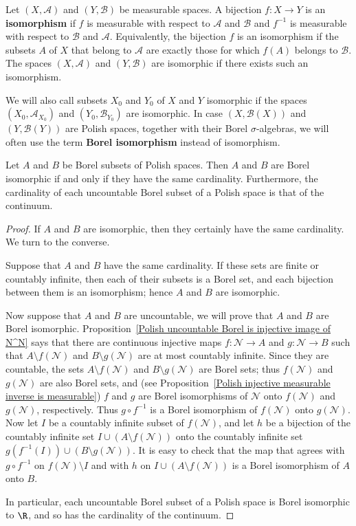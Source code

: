 Let $(X,\mathcal{A})$ and $(Y,\mathcal{B})$ be measurable spaces. A bijection $f:X\to Y$ is an \textbf{isomorphism} if $f$ is measurable with respect to $\mathcal{A}$ and $\mathcal{B}$ and $f^{-1}$ is measurable with respect to $\mathcal{B}$ and $\mathcal{A}$. Equivalently, the bijection $f$ is an isomorphism if the subsets $A$ of $X$ that belong to $\mathcal{A}$ are exactly those for which $f(A)$ belongs to $\mathcal{B}$. The spaces $(X,\mathcal{A})$ and $(Y,\mathcal{B})$ are isomorphic if there exists such an isomorphism.\par
We will also call subsets $X_0$ and $Y_0$ of $X$ and $Y$ isomorphic if the spaces $(X_0,\mathcal{A}_{X_0})$ and $(Y_0,\mathcal{B}_{Y_0})$ are isomorphic. In case $(X,\mathcal{B}(X))$ and $(Y,\mathcal{B}(Y))$ are Polish spaces, together with their Borel $\sigma$-algebras, we will often use the term \textbf{Borel isomorphism} instead of isomorphism.
\begin{theorem}\label{Polish Borel iso iff cardinality}
Let $A$ and $B$ be Borel subsets of Polish spaces. Then $A$ and $B$ are Borel isomorphic if and only if they have the same cardinality. Furthermore, the cardinality of each uncountable Borel subset of a Polish space is that of the continuum.
\end{theorem}
\begin{proof}
If $A$ and $B$ are isomorphic, then they certainly have the same cardinality. We turn to the converse.\par
Suppose that $A$ and $B$ have the same cardinality. If these sets are finite or countably infinite, then each of their subsets is a Borel set, and each bijection between them is an isomorphism; hence $A$ and $B$ are isomorphic.\par
Now suppose that $A$ and $B$ are uncountable, we will prove that $A$ and $B$ are Borel isomorphic. Proposition~\ref{Polish uncountable Borel is injective image of N^N} says that there are continuous injective maps $f:\mathscr{N}\to A$ and $g:\mathscr{N}\to B$ such that $A\setminus f(\mathscr{N})$ and $B\setminus g(\mathscr{N})$ are at most countably infinite. Since they are countable, the sets $A\setminus f(\mathscr{N})$ and $B\setminus g(\mathscr{N})$ are Borel sets; thus $f(\mathscr{N})$ and $g(\mathscr{N})$ are also Borel sets, and (see Proposition~\ref{Polish injective measurable inverse is measurable}) $f$ and $g$ are Borel isomorphisms of $\mathscr{N}$ onto $f(\mathscr{N})$ and $g(\mathscr{N})$, respectively. Thus $g\circ f^{-1}$ is a Borel isomorphism of $f(\mathscr{N})$ onto $g(\mathscr{N})$. Now let $I$ be a countably infinite subset of $f(\mathscr{N})$, and let $h$ be a bijection of the countably infinite set $I\cup(A\setminus f(\mathscr{N}))$ onto the countably infinite set $g(f^{-1}(I))\cup (B\setminus g(\mathscr{N}))$. It is easy to check that the map that agrees with $g\circ f^{-1}$ on $f(\mathscr{N})\setminus I$ and with $h$ on $I\cup(A\setminus f(\mathscr{N}))$ is a Borel isomorphism of $A$ onto $B$.\par
In particular, each uncountable Borel subset of a Polish space is Borel isomorphic to $\R$, and so has the cardinality of the continuum.
\end{proof}
